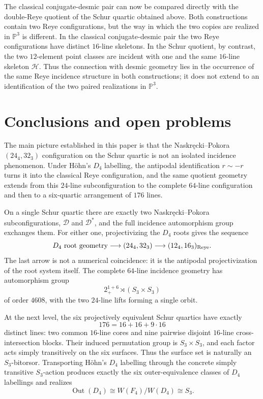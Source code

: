 \documentclass[10pt]{article}
\newcommand{\PP}{\mathbb P}
\begin{document}
The classical conjugate-desmic pair can now be compared directly with the
double-Reye quotient of the Schur quartic obtained above.  Both constructions
contain two Reye configurations, but the way in which the two copies are
realized in $\PP^3$ is different.  In the classical conjugate-desmic pair
the two Reye configurations have distinct $16$-line skeletons.  In the Schur
quotient, by contrast, the two $12$-element point classes are incident with
one and the same $16$-line skeleton $\mathcal H$.  Thus the connection with desmic geometry lies in the occurrence of the same Reye incidence structure in both constructions; it does not extend to
an identification of the two paired realizations in $\PP^3$.

\section{Conclusions and open problems}

The main picture established in this paper is that the
Naskr\k{e}cki--Pokora $(24_4,32_3)$ configuration on the Schur quartic is
not an isolated incidence phenomenon.  Under H\"ohn's $D_4$ labelling, the
antipodal identification $r\sim-r$ turns it into the classical Reye
configuration, and the same quotient geometry extends from this $24$-line
subconfiguration to the complete $64$-line configuration and then to a
six-quartic arrangement of $176$ lines.

On a single Schur quartic there are exactly two Naskr\k{e}cki--Pokora
subconfigurations, $\mathcal D$ and $\mathcal D^*$, and the full incidence
automorphism group exchanges them.  For either one, projectivizing the
$D_4$ roots gives the sequence
\[
D_4\text{ root geometry}
\longrightarrow
(24_4,32_3)
\longrightarrow
(12_4,16_3)_{\rm Reye}.
\]
The last arrow is not a numerical coincidence: it is the antipodal
projectivization of the root system itself.  The complete $64$-line
incidence geometry has automorphism group
\[
2_{+}^{1+6}\rtimes(S_3\times S_3)
\]
of order $4608$, with the two $24$-line lifts forming a single orbit.

At the next level, the six projectively equivalent Schur quartics have
exactly
\[
176=16+16+9\cdot16
\]
distinct lines: two common $16$-line cores and nine pairwise disjoint
$16$-line cross-intersection blocks.  Their induced permutation group is
$S_3\times S_3$, and each factor acts simply transitively on the six
surfaces.  Thus the surface set is naturally an $S_3$-bitorsor.  Transporting
H\"ohn's $D_4$ labelling through the concrete simply transitive $S_3$-action
produces exactly the six outer-equivalence classes of $D_4$ labellings and
realizes
\[
\operatorname{Out}(D_4)
\cong
W(F_4)/W(D_4)
\cong S_3.
\]
\end{document}
